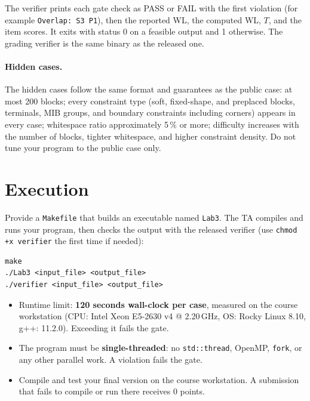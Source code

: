 \documentclass[11pt,a4paper]{article}
\newcommand{\WSMIN}{5}
\newcommand{\WSMINbox}{\WSMIN}
\newcommand{\kw}[1]{\texttt{#1}}
\begin{document}
The verifier prints each gate check as PASS or FAIL with the first violation
(for example \kw{Overlap: S3 P1}), then the reported WL, the computed WL, $T$,
and the item scores. It exits with status 0 on a feasible output and 1
otherwise. The grading verifier is the same binary as the released one.

\paragraph{Hidden cases.} The hidden cases follow the same format and
guarantees as the public case: at most 200 blocks; every constraint type
(soft, fixed-shape, and preplaced blocks, terminals, MIB groups, and boundary
constraints including corners) appears in every case; whitespace ratio
approximately \WSMINbox\,\% or more; difficulty increases with the number of blocks, tighter
whitespace, and higher constraint density. Do not tune your program to the
public case only.

\section{Execution}

Provide a \kw{Makefile} that builds an executable named \kw{Lab3}. The TA
compiles and runs your program, then checks the output with the released
verifier (use \kw{chmod +x verifier} the first time if needed):
\begin{Verbatim}[frame=single]
make
./Lab3 <input_file> <output_file>
./verifier <input_file> <output_file>
\end{Verbatim}
\begin{itemize}
  \item Runtime limit: \textbf{120 seconds wall-clock per case}, measured on
        the course workstation (CPU: Intel Xeon E5-2630 v4 @ 2.20\,GHz,
        OS: Rocky Linux 8.10, g++: 11.2.0). Exceeding
        it fails the gate.
  \item The program must be \textbf{single-threaded}: no \kw{std::thread},
        OpenMP, \kw{fork}, or any other parallel work. A violation fails the
        gate.
  \item Compile and test your final version on the course workstation. A
        submission that fails to compile or run there receives 0 points.
\end{itemize}

\end{document}
